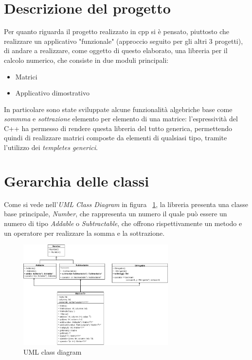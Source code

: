 \section{Descrizione del progetto}
Per quanto riguarda il progetto realizzato in cpp si è pensato, piuttosto che realizzare un applicativo "funzionale" (approccio seguito per gli altri 3 progetti), di andare a realizzare, come oggetto di questo elaborato, una libreria per il calcolo numerico, che consiste in due moduli principali:
\begin{itemize}
	\item Matrici
	\item Applicativo dimostrativo
\end{itemize}

In particolare sono state sviluppate alcune funzionalità algebriche base come \textit{sommma} e \textit{sottrazione} elemento per elemento di una matrice: l'espressività del C++ ha permesso di rendere questa libreria del tutto generica, permettendo quindi di realizzare matrici composte da elementi di qualsiasi tipo, tramite l'utilizzo dei \textit{templetes generici}.

\section{Gerarchia delle classi}
Come si vede nell'\textit{UML Class Diagram} in figura ~\ref{fig:UMLClassDiagram}, la libreria presenta una classe base principale, \textit{Number}, che rappresenta un numero il quale può essere un numero di tipo \textit{Addable} o \textit{Subtractable}, che offrono rispettivamente un metodo e un operatore per realizzare la somma e la sottrazione.
\begin{figure}[h]
	\centering
	\includegraphics[width=0.7\textwidth]{Immagini/ClassDiagram.jpg}
	\caption{UML class diagram}
	\label{fig:UMLClassDiagram}
\end{figure}

